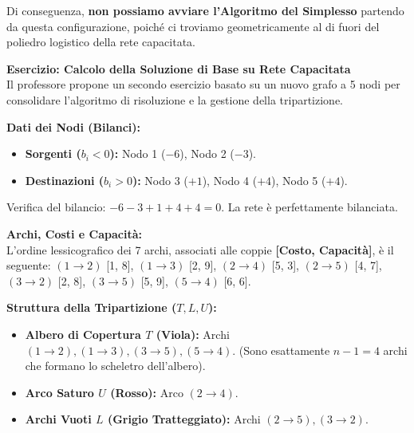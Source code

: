 \documentclass[12pt, a4paper]{article}
\begin{document}
	Di conseguenza, \textbf{non possiamo avviare l'Algoritmo del Simplesso} partendo da questa configurazione, poiché ci troviamo geometricamente al di fuori del poliedro logistico della rete capacitata.
	
	\textbf{Esercizio: Calcolo della Soluzione di Base su Rete Capacitata}\\
	Il professore propone un secondo esercizio basato su un nuovo grafo a 5 nodi per consolidare l'algoritmo di risoluzione e la gestione della tripartizione.
	
	\textbf{Dati dei Nodi (Bilanci):}
	\begin{itemize}[label=\textcolor{titlecolor}{\Large\textbullet}, itemsep=2pt, leftmargin=1.5cm]
		\item \textbf{Sorgenti ($b_i < 0$):} Nodo 1 ($-6$), Nodo 2 ($-3$).
		\item \textbf{Destinazioni ($b_i > 0$):} Nodo 3 ($+1$), Nodo 4 ($+4$), Nodo 5 ($+4$).
	\end{itemize}
	Verifica del bilancio: $-6 -3 + 1 + 4 + 4 = 0$. La rete è perfettamente bilanciata.
	
	\textbf{Archi, Costi e Capacità:}\\
	L'ordine lessicografico dei 7 archi, associati alle coppie \textbf{[Costo, Capacità]}, è il seguente:
	$(1\to2)$ [1, 8], $(1\to3)$ [2, 9], $(2\to4)$ [5, 3], $(2\to5)$ [4, 7], $(3\to2)$ [2, 8], $(3\to5)$ [5, 9], $(5\to4)$ [6, 6].
	
	\textbf{Struttura della Tripartizione ($T, L, U$):}
	\begin{itemize}[label=$\circ$, itemsep=2pt, leftmargin=1.5cm]
		\item \textbf{Albero di Copertura $T$ (Viola):} Archi $(1\to2), (1\to3), (3\to5), (5\to4)$. (Sono esattamente $n-1 = 4$ archi che formano lo scheletro dell'albero).
		\item \textbf{Arco Saturo $U$ (Rosso):} Arco $(2\to4)$.
		\item \textbf{Archi Vuoti $L$ (Grigio Tratteggiato):} Archi $(2\to5), (3\to2)$.
	\end{itemize}
	
\end{document}
